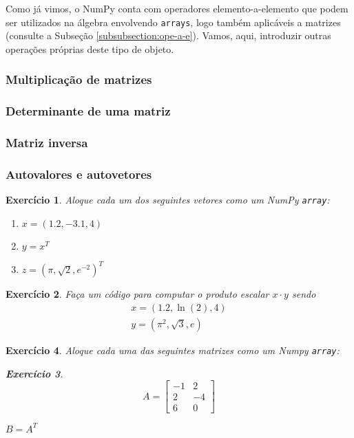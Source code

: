 \documentclass[12pt]{article}
\newtheorem{exr}{Exercício}[section]
\begin{document}
Como já vimos, o NumPy conta com operadores elemento-a-elemento que podem ser utilizados na álgebra envolvendo \lstinline+arrays+, logo também aplicáveis a matrizes (consulte a Subseção \ref{subsubsection:ope-a-e}). Vamos, aqui, introduzir outras operações próprias deste tipo de objeto.

\subsubsection{Multiplicação de matrizes}

\emconstrucao

\subsubsection{Determinante de uma matriz}

\emconstrucao

\subsubsection{Matriz inversa}

\emconstrucao

\subsubsection{Autovalores e autovetores}

\emconstrucao

\begin{exr}
  Aloque cada um dos seguintes vetores como um NumPy \lstinline+array+:
  \begin{enumerate}
  \item[a)] $x = (1.2, -3.1, 4)$
  \item[b)] $y = x^T$
  \item[c)] $z = (\pi, \sqrt{2}, e^{-2})^T$
  \end{enumerate}
\end{exr}

\begin{exr}
  Faça um código para computar o produto escalar $x\cdot y$ sendo
  \begin{gather}
    x = (1.2, \ln(2), 4)\\
    y = (\pi^2, \sqrt{3}, e)
  \end{gather}
\end{exr}

\begin{exr}
  Aloque cada uma das seguintes matrizes como um Numpy \lstinline+array+:
  \begin{exr}
  \item[a)]
    \begin{equation}
      A =
      \begin{bmatrix}
        -1 & 2\\
        2 & -4\\
        6 & 0
      \end{bmatrix}
    \end{equation}
  \item[b)] $B = A^T$ 
  \end{exr}
\end{exr}
\end{document}
